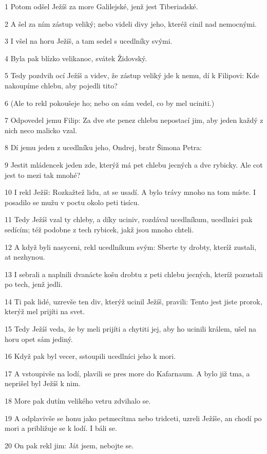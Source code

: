 \par 1 Potom odšel Ježíš za more Galilejské, jenž jest Tiberiadské.
\par 2 A šel za ním zástup veliký; nebo videli divy jeho, kteréž cinil nad nemocnými.
\par 3 I všel na horu Ježíš, a tam sedel s ucedlníky svými.
\par 4 Byla pak blízko velikanoc, svátek Židovský.
\par 5 Tedy pozdvih ocí Ježíš a videv, že zástup veliký jde k nemu, dí k Filipovi: Kde nakoupíme chlebu, aby pojedli tito?
\par 6 (Ale to rekl pokoušeje ho; nebo on sám vedel, co by mel uciniti.)
\par 7 Odpovedel jemu Filip: Za dve ste penez chlebu nepostací jim, aby jeden každý z nich neco malicko vzal.
\par 8 Dí jemu jeden z ucedlníku jeho, Ondrej, bratr Šimona Petra:
\par 9 Jestit mládencek jeden zde, kterýž má pet chlebu jecných a dve rybicky. Ale cot jest to mezi tak mnohé?
\par 10 I rekl Ježíš: Rozkažtež lidu, at se usadí. A bylo trávy mnoho na tom míste. I posadilo se mužu v poctu okolo peti tisícu.
\par 11 Tedy Ježíš vzal ty chleby, a díky uciniv, rozdával ucedlníkum, ucedlníci pak sedícím; též podobne z tech rybicek, jakž jsou mnoho chteli.
\par 12 A když byli nasyceni, rekl ucedlníkum svým: Sberte ty drobty, kteríž zustali, at nezhynou.
\par 13 I sebrali a naplnili dvanácte košu drobtu z peti chlebu jecných, kteríž pozustali po tech, jenž jedli.
\par 14 Ti pak lidé, uzrevše ten div, kterýž ucinil Ježíš, pravili: Tento jest jiste prorok, kterýž mel prijíti na svet.
\par 15 Tedy Ježíš veda, že by meli prijíti a chytiti jej, aby ho ucinili králem, ušel na horu opet sám jediný.
\par 16 Když pak byl vecer, sstoupili ucedlníci jeho k mori.
\par 17 A vstoupivše na lodí, plavili se pres more do Kafarnaum. A bylo již tma, a neprišel byl Ježíš k nim.
\par 18 More pak dutím velikého vetru zdvihalo se.
\par 19 A odplavivše se honu jako petmecítma nebo tridceti, uzreli Ježíše, an chodí po mori a približuje se k lodí. I báli se.
\par 20 On pak rekl jim: Ját jsem, nebojte se.
